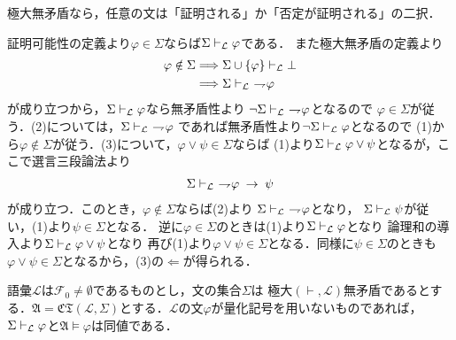 	極大無矛盾なら，任意の文は「証明される」か「否定が証明される」の二択．
	
	\begin{sketch}
		証明可能性の定義より$\varphi \in \Sigma$ならば$\Sigma \vdash_{{\scriptsize \mathcal{L}}} \varphi$である．
		また極大無矛盾の定義より
		\begin{align}
			\varphi \notin \Sigma 
			&\Longrightarrow \Sigma \cup \{\varphi\} \provable{\mathcal{L}} \bot \\
			&\Longrightarrow \Sigma \provable{\mathcal{L}}\ \negation \varphi
		\end{align}
		が成り立つから，$\Sigma \vdash_{{\scriptsize \mathcal{L}}} \varphi$なら無矛盾性より
		$\neg \Sigma \vdash_{{\scriptsize \mathcal{L}}}\ \rightharpoondown\hspace{-0.25em} \varphi$となるので
		$\varphi \in \Sigma$が従う．(2)については，$\Sigma \vdash_{{\scriptsize \mathcal{L}}}\ \rightharpoondown\hspace{-0.25em} \varphi$
		であれば無矛盾性より$\neg \Sigma \vdash_{{\scriptsize \mathcal{L}}} \varphi$となるので
		(1)から$\varphi \notin \Sigma$が従う．(3)について，$\varphi \vee \psi \in \Sigma$ならば
		(1)より$\Sigma \vdash_{{\scriptsize \mathcal{L}}} \varphi \vee \psi$となるが，ここで選言三段論法より
		\begin{align}
			\Sigma \vdash_{{\scriptsize \mathcal{L}}}\ \rightharpoondown\hspace{-0.25em} \varphi \hspace{0.25em}\rightarrow\hspace{0.25em} \psi
		\end{align}
		が成り立つ．このとき，$\varphi \notin \Sigma$ならば(2)より
		$\Sigma \vdash_{{\scriptsize \mathcal{L}}}\ \rightharpoondown\hspace{-0.25em} \varphi$となり，
		$\Sigma \vdash_{{\scriptsize \mathcal{L}}} \psi$が従い，(1)より$\psi \in \Sigma$となる．
		逆に$\varphi \in \Sigma$のときは(1)より$\Sigma \vdash_{{\scriptsize \mathcal{L}}} \varphi$となり
		論理和の導入より$\Sigma \vdash_{{\scriptsize \mathcal{L}}} \varphi \vee \psi$となり
		再び(1)より$\varphi \vee \psi \in \Sigma$となる．同様に$\psi \in \Sigma$のときも
		$\varphi \vee \psi \in \Sigma$となるから，(3)の$\Longleftarrow$が得られる．
		\QED
	\end{sketch}
	
	\begin{screen}
		\begin{thm}[補題2.12.14]
			語彙$\mathcal{L}$は$\mathcal{F}_{0} \neq \emptyset$であるものとし，文の集合$\Sigma$は
			極大$(\vdash,\mathcal{L})$無矛盾であるとする．$\mathfrak{A} = \mathfrak{CT}
			(\mathcal{L},\Sigma)$とする．$\mathcal{L}$の文$\varphi$が量化記号を用いないものであれば，
			$\Sigma \vdash_{{\scriptsize \mathcal{L}}} \varphi$と$\mathfrak{A} \models \varphi$は同値である．
		\end{thm}
	\end{screen}
	
